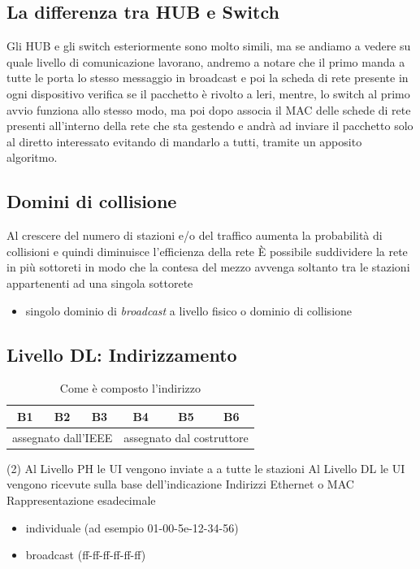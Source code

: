\documentclass{book}
\begin{document}
\subsection{La differenza tra HUB e Switch}
Gli HUB e gli switch esteriormente sono molto simili, ma se andiamo a vedere su
quale livello di comunicazione lavorano, andremo a notare che il primo manda a
tutte le porta lo stesso messaggio in broadcast e poi la scheda di rete
presente in ogni dispositivo verifica se il pacchetto è rivolto a leri, mentre,
lo switch al primo avvio funziona allo stesso modo, ma poi dopo associa il MAC
delle schede di rete presenti all'interno della rete che sta gestendo e andrà
ad inviare il pacchetto solo al diretto interessato evitando di mandarlo a
tutti, tramite un apposito algoritmo.

\subsection{Domini di collisione}
\begin{tasks}
	\task Al crescere del numero di stazioni e/o del traffico aumenta la
	probabilità di collisioni e quindi diminuisce l'efficienza della rete
	\task È possibile suddividere la rete in più sottoreti in modo che la
	contesa del mezzo avvenga soltanto tra le stazioni appartenenti ad una
	singola sottorete
	\begin{itemize}
		\item singolo dominio di \textit{broadcast} a livello fisico o dominio
			di collisione
	\end{itemize}
\end{tasks}

\subsection{Livello DL: Indirizzamento}
\begin{table}[h!]
	\centering
	\begin{tabular}{|c||c||c||c||c||c|}
		\hline
		B1&B2&B3&B4&B5&B6\\\hline
		\multicolumn{3}{c}{assegnato dall'IEEE}&\multicolumn{3}{c}{assegnato
		dal costruttore}
	\end{tabular}
	\caption{Come è composto l'indirizzo}
\end{table}
\begin{tasks}(2)
	\task Al Livello PH le UI vengono inviate a a tutte le stazioni
	\task Al Livello DL le UI vengono ricevute sulla base dell'indicazione
	\task Indirizzi Ethernet o MAC
	\task Rappresentazione esadecimale
	\begin{itemize}
		\item individuale (ad esempio 01-00-5e-12-34-56)
		\item broadcast (ff-ff-ff-ff-ff-ff)
	\end{itemize}
\end{tasks}
\end{document}
